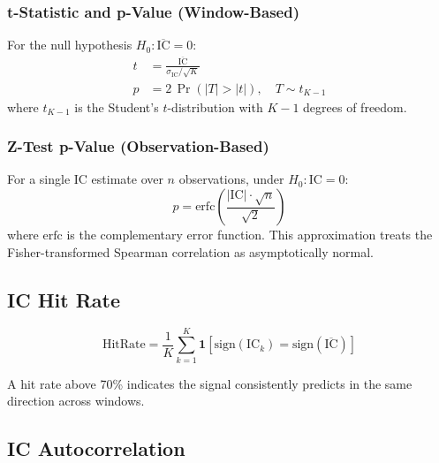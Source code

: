 \documentclass[11pt,a4paper]{article}
\begin{document}
\subsubsection{t-Statistic and p-Value (Window-Based)}

For the null hypothesis $H_0\!: \overline{\mathrm{IC}} = 0$:
\begin{align}
    t &= \frac{\overline{\mathrm{IC}}}{\sigma_{\mathrm{IC}} / \sqrt{K}}
    \label{eq:t_stat} \\[6pt]
    p &= 2\,\Pr\!\left(|T| > |t|\right), \quad T \sim t_{K-1}
    \label{eq:p_value}
\end{align}
where $t_{K-1}$ is the Student's $t$-distribution with $K-1$ degrees of freedom.

\subsubsection{Z-Test p-Value (Observation-Based)}

For a single IC estimate over $n$ observations, under $H_0\!: \mathrm{IC} = 0$:
\begin{equation}
    p = \mathrm{erfc}\!\left(\frac{|\mathrm{IC}| \cdot \sqrt{n}}{\sqrt{2}}\right)
    \label{eq:z_pvalue}
\end{equation}
where $\mathrm{erfc}$ is the complementary error function. This approximation
treats the Fisher-transformed Spearman correlation as asymptotically normal.

\subsection{IC Hit Rate}

\begin{equation}
    \mathrm{HitRate} = \frac{1}{K} \sum_{k=1}^{K}
        \mathbf{1}\!\left[\mathrm{sign}(\mathrm{IC}_k)
        = \mathrm{sign}(\overline{\mathrm{IC}})\right]
    \label{eq:hit_rate}
\end{equation}

A hit rate above 70\% indicates the signal consistently predicts in the same
direction across windows.

\subsection{IC Autocorrelation}
\end{document}
